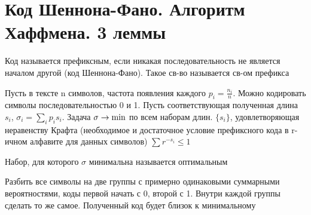 \documentclass[discrete.tex]{subfiles}
\begin{document}
  \section{Код Шеннона-Фано. Алгоритм Хаффмена. 3 леммы}

  \begin{definition}
    Код называется префиксным, если никакая последовательность не является началом другой (код Шеннона-Фано). Такое св-во называется св-ом префикса
  \end{definition}

  \begin{task}
    Пусть в тексте n символов, частота появления каждого $p_i = \frac{n_i}{n}$. Можно кодировать символы последовательностью 0 и 1. Пусть соответствующая полученная длина $s_i$, $\sigma_i = \sum_i p_i s_i$. Задача $\sigma \rightarrow \min$ по всем наборам длин. $\{s_i\}$, удовлетворяющая неравенству Крафта (необходимое и достаточное условие префиксного кода в r-ичном алфавите для данных символов) $\sum r^{-s_i} \leq 1$
  \end{task}

  \begin{definition}
    Набор, для которого $\sigma$ минимальна называется оптимальным
  \end{definition}

  \begin{sol}
    Разбить все символы на две группы с примерно одинаковыми суммарными вероятностями, коды первой начать с 0, второй с 1. Внутри каждой группы сделать то же самое. Полученный код будет близок к минимальному
  \end{sol}
\end{document}
